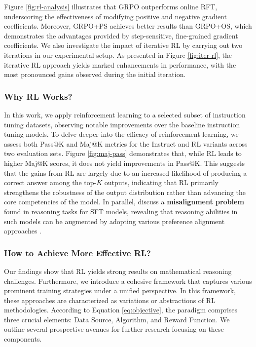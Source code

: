 \begin{itemize}[topsep=0pt]
Figure \ref{fig:rl-analysis} illustrates that GRPO outperforms online RFT, underscoring the effectiveness of modifying positive and negative gradient coefficients. Moreover, GRPO+PS achieves better results than GRPO+OS, which demonstrates the advantages provided by step-sensitive, fine-grained gradient coefficients. We also investigate the impact of iterative RL by carrying out two iterations in our experimental setup. As presented in Figure \ref{fig:iter-rl}, the iterative RL approach yields marked enhancements in performance, with the most pronounced gains observed during the initial iteration.

\subsubsection{Why RL Works?} In this work, we apply reinforcement learning to a selected subset of instruction tuning datasets, observing notable improvements over the baseline instruction tuning models. To delve deeper into the efficacy of reinforcement learning, we assess both Pass@K and Maj@K metrics for the Instruct and RL variants across two evaluation sets. Figure \ref{fig:maj-pass} demonstrates that, while RL leads to higher Maj@K scores, it does not yield improvements in Pass@K. This suggests that the gains from RL are largely due to an increased likelihood of producing a correct answer among the top-$K$ outputs, indicating that RL primarily strengthens the robustness of the output distribution rather than advancing the core competencies of the model. In parallel, \citep{wang2023making} discuss a \textbf{misalignment problem} found in reasoning tasks for SFT models, revealing that reasoning abilities in such models can be augmented by adopting various preference alignment approaches \citep{yuan2023rrhf,song2023preference,wang2023making}.

\subsubsection{How to Achieve More Effective RL?}
\label{sec:effec_rl}
Our findings show that RL yields strong results on mathematical reasoning challenges. Furthermore, we introduce a cohesive framework that captures various prominent training strategies under a unified perspective. In this framework, these approaches are characterized as variations or abstractions of RL methodologies. According to Equation \ref{eq:objective}, the paradigm comprises three crucial elements: Data Source, Algorithm, and Reward Function. We outline several prospective avenues for further research focusing on these components.


\end{itemize}
